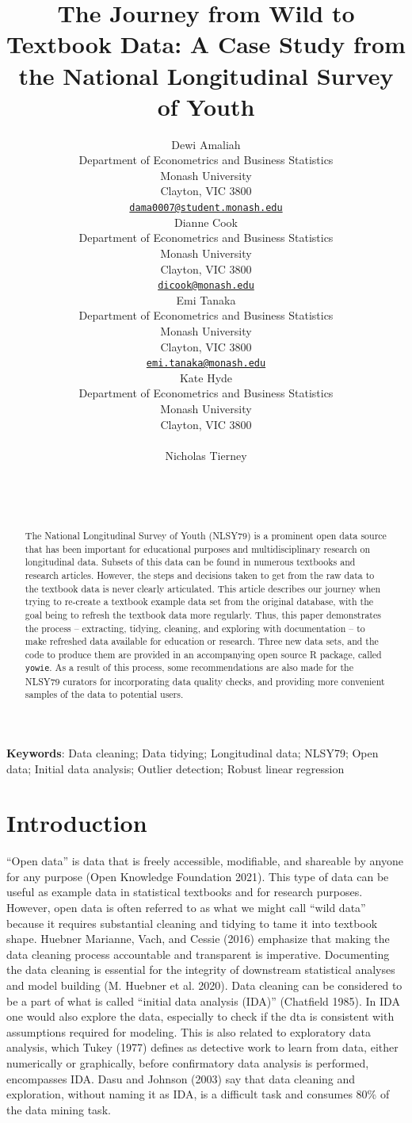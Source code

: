\documentclass{article}
\title{The Journey from Wild to Textbook Data: A Case Study from the National Longitudinal Survey of Youth}
\author{
    Dewi Amaliah
   \\
    Department of Econometrics and Business Statistics \\
    Monash University \\
  Clayton, VIC 3800 \\
  \texttt{\href{mailto:dama0007@student.monash.edu}{\nolinkurl{dama0007@student.monash.edu}}} \\
   \And
    Dianne Cook
   \\
    Department of Econometrics and Business Statistics \\
    Monash University \\
  Clayton, VIC 3800 \\
  \texttt{\href{mailto:dicook@monash.edu}{\nolinkurl{dicook@monash.edu}}} \\
   \And
    Emi Tanaka
   \\
    Department of Econometrics and Business Statistics \\
    Monash University \\
  Clayton, VIC 3800 \\
  \texttt{\href{mailto:emi.tanaka@monash.edu}{\nolinkurl{emi.tanaka@monash.edu}}} \\
   \And
    Kate Hyde
   \\
    Department of Econometrics and Business Statistics \\
    Monash University \\
  Clayton, VIC 3800 \\
  \texttt{} \\
   \And
    Nicholas Tierney
   \\
     \\
   \\
  \texttt{} \\
  }
\begin{document}
\maketitle

\def\tightlist{}


\begin{abstract}
The National Longitudinal Survey of Youth (NLSY79) is a prominent open data source that has been important for educational purposes and multidisciplinary research on longitudinal data. Subsets of this data can be found in numerous textbooks and research articles. However, the steps and decisions taken to get from the raw data to the textbook data is never clearly articulated. This article describes our journey when trying to re-create a textbook example data set from the original database, with the goal being to refresh the textbook data more regularly. Thus, this paper demonstrates the process -- extracting, tidying, cleaning, and exploring with documentation -- to make refreshed data available for education or research. Three new data sets, and the code to produce them are provided in an accompanying open source R package, called \texttt{yowie}. As a result of this process, some recommendations are also made for the NLSY79 curators for incorporating data quality checks, and providing more convenient samples of the data to potential users.
\end{abstract}


\textbf{Keywords}: Data cleaning; Data tidying; Longitudinal data; NLSY79; Open data; Initial data analysis; Outlier detection; Robust linear regression

\hypertarget{intro}{%
\section{Introduction}\label{intro}}

``Open data'' is data that is freely accessible, modifiable, and shareable by anyone for any purpose (Open Knowledge Foundation 2021). This type of data can be useful as example data in statistical textbooks and for research purposes. However, open data is often referred to as what we might call ``wild data'' because it requires substantial cleaning and tidying to tame it into textbook shape. Huebner Marianne, Vach, and Cessie (2016) emphasize that making the data cleaning process accountable and transparent is imperative. Documenting the data cleaning is essential for the integrity of downstream statistical analyses and model building (M. Huebner et al. 2020).
Data cleaning can be considered to be a part of what is called ``initial data analysis (IDA)'' (Chatfield 1985). In IDA one would also explore the data, especially to check if the dta is consistent with assumptions required for modeling. This is also related to exploratory data analysis, which Tukey (1977) defines as detective work to learn from data, either numerically or graphically, before confirmatory data analysis is performed, encompasses IDA. Dasu and Johnson (2003) say that data cleaning and exploration, without naming it as IDA, is a difficult task and consumes 80\% of the data mining task.
\end{document}
